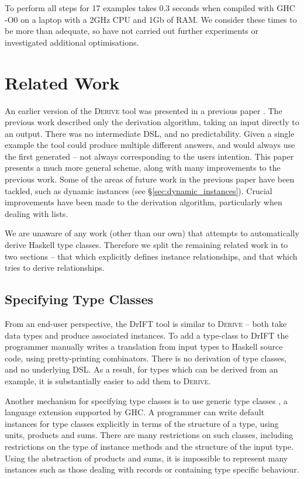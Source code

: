 \documentclass[preprint,draft]{sigplanconf}
\newcommand{\derive}{\textsc{Derive}}
\begin{document}
To perform all steps for 17 examples takes 0.3 seconds when compiled with GHC -O0 on a laptop with a 2GHz CPU and 1Gb of RAM. We consider these times to be more than adequate, so have not carried out further experiments or investigated additional optimisations.

\section{Related Work}
\label{sec:related}

An earlier version of the \derive{} tool was presented in a previous paper \cite{me:yds_derive}. The previous work described only the derivation algorithm, taking an input directly to an output. There was no intermediate DSL, and no predictability. Given a single example the tool could produce multiple different answers, and would always use the first generated -- not always corresponding to the users intention. This paper presents a much more general scheme, along with many improvements to the previous work. Some of the areas of future work in the previous paper have been tackled, such as dynamic instances (see \S\ref{sec:dynamic_instances}). Crucial improvements have been made to the derivation algorithm, particularly when dealing with lists.

We are unaware of any work (other than our own) that attempts to automatically derive Haskell type classes. Therefore we split the remaining related work in to two sections -- that which explicitly defines instance relationships, and that which tries to derive relationships.

\subsection{Specifying Type Classes}

From an end-user perspective, the DrIFT tool \cite{drift} is similar to \derive{} -- both take data types and produce associated instances. To add a type-class to DrIFT the programmer manually writes a translation from input types to Haskell source code, using pretty-printing combinators. There is no derivation of type classes, and no underlying DSL. As a result, for types which can be derived from an example, it is substantially easier to add them to \derive{}.

Another mechanism for specifying type classes is to use generic type classes \cite{hinze:derivable_type_classes}, a language extension supported by GHC. A programmer can write default instances for type classes explicitly in terms of the structure of a type, using units, products and sums. There are many restrictions on such classes, including restrictions on the type of instance methods and the structure of the input type. Using the abstraction of products and sums, it is impossible to represent many instances such as those dealing with records or containing type specific behaviour.
\end{document}

